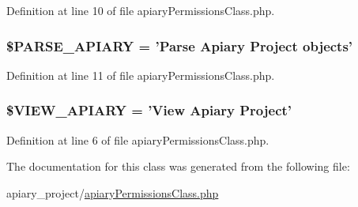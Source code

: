 Definition at line 10 of file apiaryPermissionsClass.php.

\hypertarget{classapiary_permissions_class_afb033d7a5a307633fb699003fcdf41ea}{
\subsubsection[{\$PARSE\_\-APIARY}]{\setlength{\rightskip}{0pt plus 5cm}\$PARSE\_\-APIARY = 'Parse Apiary Project objects'}}
\label{classapiary_permissions_class_afb033d7a5a307633fb699003fcdf41ea}


Definition at line 11 of file apiaryPermissionsClass.php.

\hypertarget{classapiary_permissions_class_a37d9d8b791e84a572596899b5bd45e6b}{
\subsubsection[{\$VIEW\_\-APIARY}]{\setlength{\rightskip}{0pt plus 5cm}\$VIEW\_\-APIARY = 'View Apiary Project'}}
\label{classapiary_permissions_class_a37d9d8b791e84a572596899b5bd45e6b}


Definition at line 6 of file apiaryPermissionsClass.php.



The documentation for this class was generated from the following file:\begin{DoxyCompactItemize}
\item 
apiary_project/\hyperlink{apiary_permissions_class_8php}{apiaryPermissionsClass.php}\end{DoxyCompactItemize}
